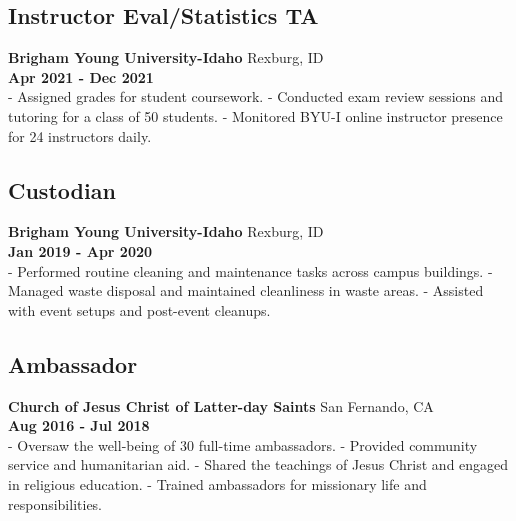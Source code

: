 \documentclass[
  letterpaper,
  DIV=11,
  numbers=noendperiod]{scrartcl}
\begin{document}
\subsection{Instructor Eval/Statistics
TA}\label{instructor-evalstatistics-ta}

\textbf{Brigham Young University-Idaho} \textbar{} Rexburg, ID\\
\textbf{Apr 2021 - Dec 2021}\\
- Assigned grades for student coursework. - Conducted exam review
sessions and tutoring for a class of 50 students. - Monitored BYU-I
online instructor presence for 24 instructors daily.

\subsection{Custodian}\label{custodian}

\textbf{Brigham Young University-Idaho} \textbar{} Rexburg, ID\\
\textbf{Jan 2019 - Apr 2020}\\
- Performed routine cleaning and maintenance tasks across campus
buildings. - Managed waste disposal and maintained cleanliness in waste
areas. - Assisted with event setups and post-event cleanups.

\subsection{Ambassador}\label{ambassador}

\textbf{Church of Jesus Christ of Latter-day Saints} \textbar{} San
Fernando, CA\\
\textbf{Aug 2016 - Jul 2018}\\
- Oversaw the well-being of 30 full-time ambassadors. - Provided
community service and humanitarian aid. - Shared the teachings of Jesus
Christ and engaged in religious education. - Trained ambassadors for
missionary life and responsibilities.
\end{document}

